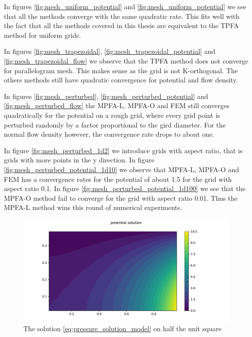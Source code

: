 \documentclass[../Main/main.tex]{subfiles}
\begin{document}
		\par
		In figures \ref{fig:mesh_uniform_potential} and \ref{fig:mesh_uniform_potential} we see that all the methods converge with the same quadratic rate. This fits well with the fact that all the methods covered in this thesis are equivalent to the TPFA method for uniform grids.
		\par
		In figures \ref{fig:mesh_trapezoidal}, \ref{fig:mesh_trapezoidal_potential} and \ref{fig:mesh_trapezoidal_flow} we observe that the TPFA method does not converge for parallelogram mesh. This makes sense as the grid is not K-orthogonal. The others methods still have quadratic convergence for potential and flow density.
		\par
		In figures \ref{fig:mesh_perturbed}, \ref{fig:mesh_perturbed_potential} and \ref{fig:mesh_perturbed_flow} the MPFA-L, MPFA-O and FEM still converges quadratically for the potential on a rough grid, where every grid point is perturbed randomly by a factor proportional to the gird diameter. For the normal flow density however, the convergence rate drops to about one.
		\par 
		In figure \ref{fig:mesh_perturbed_1d2} we introduce grids with aspect ratio, that is grids with more points in the y direction.
		In figure \ref{fig:mesh_perturbed_potential_1d10} we observe that MPFA-L, MPFA-O and FEM has a convergence rates for the potential of about 1.5 for the grid with aspect ratio 0.1. In figure \ref{fig:mesh_perturbed_potential_1d100} we see that the MPFA-O method fail to converge for the grid with aspect ratio 0.01. Thus the MPFA-L method wins this round of numerical experiments.
		\begin{figure}[h]
			\centering
			\includegraphics[width=1\textwidth]{Potential.pdf}
			\caption{The solution \eqref{eq:pressure_solution_model} on half the unit square }
			\label{fig:solution}
		\end{figure}
\end{document}
